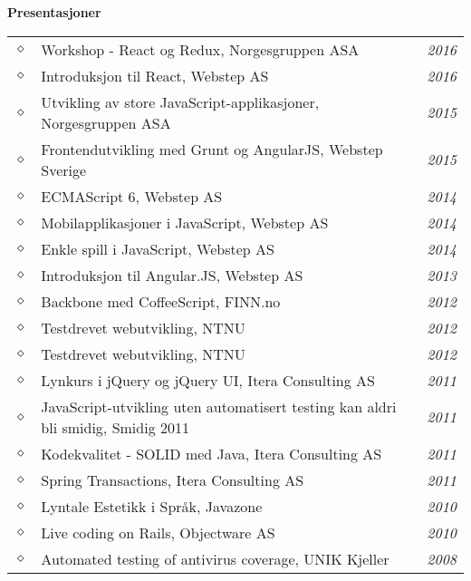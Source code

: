 \documentclass[overlapped,line,letterpaper]{res}
\begin{document}
\begin{resume}
\begin{tabularx}{\textwidth}{lXr}
\end{tabularx}

\section{}
\textbf{Presentasjoner}\\
\makebox[\textwidth]{\hrulefill}

\begin{tabularx}{\textwidth}{lXr}
$\diamond$	& Workshop - React og Redux, Norgesgruppen ASA & \textit{2016} \\
$\diamond$	& Introduksjon til React, Webstep AS & \textit{2016} \\
$\diamond$	& Utvikling av store JavaScript-applikasjoner, Norgesgruppen ASA & \textit{2015} \\
$\diamond$	& Frontendutvikling med Grunt og AngularJS, Webstep Sverige & \textit{2015} \\
$\diamond$	& ECMAScript 6, Webstep AS & \textit{2014} \\
$\diamond$	& Mobilapplikasjoner i JavaScript, Webstep AS & \textit{2014} \\
$\diamond$	& Enkle spill i JavaScript, Webstep AS & \textit{2014} \\
$\diamond$	& Introduksjon til Angular.JS, Webstep AS & \textit{2013} \\
$\diamond$	& Backbone med CoffeeScript, FINN.no & \textit{2012} \\
$\diamond$	& Testdrevet webutvikling, NTNU & \textit{2012} \\
$\diamond$	& Testdrevet webutvikling, NTNU & \textit{2012} \\
$\diamond$	& Lynkurs i jQuery og jQuery UI, Itera Consulting AS & \textit{2011} \\
$\diamond$	& JavaScript-utvikling uten automatisert testing kan aldri bli smidig, Smidig 2011 & \textit{2011} \\
$\diamond$	& Kodekvalitet - SOLID med Java, Itera Consulting AS & \textit{2011} \\
$\diamond$	& Spring Transactions, Itera Consulting AS & \textit{2011} \\
$\diamond$	& Lyntale Estetikk i Språk, Javazone & \textit{2010} \\
$\diamond$	& Live coding on Rails, Objectware AS & \textit{2010} \\
$\diamond$	& Automated testing of antivirus coverage, UNIK Kjeller & \textit{2008} \\
\end{tabularx}


\end{resume}
\end{document}
